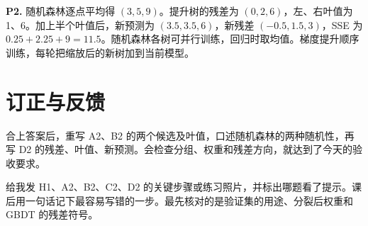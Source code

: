\documentclass[UTF8,a4paper,11pt]{ctexart}
\begin{document}
\textbf{P2.} 随机森林逐点平均得 $(3,5,9)$。提升树的残差为 $(0,2,6)$，左、右叶值为 1、6。加上半个叶值后，新预测为 $(3.5,3.5,6)$，新残差 $(-0.5,1.5,3)$，SSE 为 $0.25+2.25+9=11.5$。随机森林各树可并行训练，回归时取均值。梯度提升顺序训练，每轮把缩放后的新树加到当前模型。

\section{订正与反馈}
合上答案后，重写 A2、B2 的两个候选及叶值，口述随机森林的两种随机性，再写 D2 的残差、叶值、新预测。会检查分组、权重和残差方向，就达到了今天的验收要求。

给我发 H1、A2、B2、C2、D2 的关键步骤或练习照片，并标出哪题看了提示。课后用一句话记下最容易写错的一步。最先核对的是验证集的用途、分裂后权重和 GBDT 的残差符号。
\end{document}
